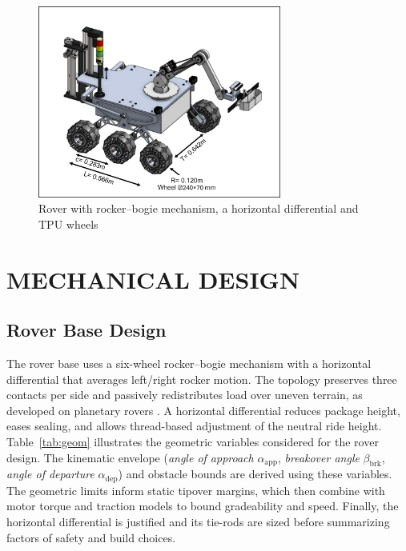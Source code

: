\documentclass[letterpaper, 10 pt, conference]{ieeeconf}  %
\begin{document}
    \begin{figure}[htbp]
    \centerline{\includegraphics[width=80mm]{figures/rover_iso.png}}
    \caption{Rover with rocker--bogie mechanism, a horizontal differential and TPU wheels}
    \label{fig:rover_iso}
    \end{figure}

\section{MECHANICAL DESIGN}
\subsection{Rover Base Design}
The rover base uses a six-wheel rocker--bogie mechanism with a horizontal differential that averages left/right rocker motion. The topology preserves three contacts per side and passively redistributes load over uneven terrain, as developed on planetary rovers \cite{harrington2004,rivellini1993}. A horizontal differential reduces package height, eases sealing, and allows thread-based adjustment of the neutral ride height. Table~\ref{tab:geom} illustrates the geometric variables considered for the rover design. The kinematic envelope (\emph{angle of approach} \(\alpha_{\mathrm{app}}\), \emph{breakover angle} \(\beta_{\mathrm{brk}}\), \emph{angle of departure} \(\alpha_{\mathrm{dep}}\)) and obstacle bounds are derived using these variables. The geometric limits inform static tipover margins, which then combine with motor torque and traction models to bound gradeability and speed. Finally, the horizontal differential is justified and its tie-rods are sized before summarizing factors of safety and build choices.
\end{document}

